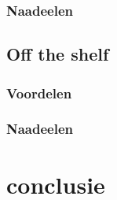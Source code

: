 \subsubsection{Naadeelen}



\subsection{Off the shelf}



\subsubsection{Voordelen}



\subsubsection{Naadeelen}



\section{conclusie}

